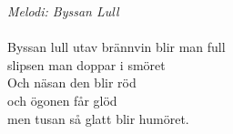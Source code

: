{\footnotesize\textit{Melodi: Byssan Lull}}\\
\\
\revrpt Byssan lull utav brännvin blir man full\\
slipsen man doppar i smöret\rpt\\
Och näsan den blir röd\\
och ögonen får glöd\\
men tusan så glatt blir humöret.
